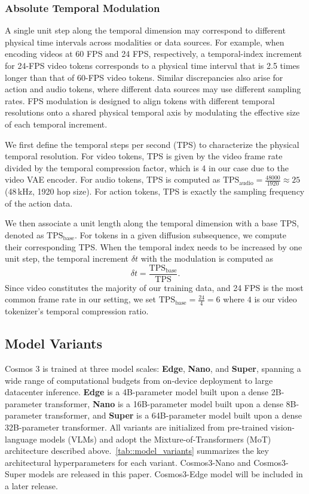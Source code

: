 \documentclass{llmxive}
\begin{document}
\subsubsection{Absolute Temporal Modulation}
A single unit step along the temporal dimension may correspond to different physical time intervals across modalities or data sources. For example, when encoding videos at 60 FPS and 24 FPS, respectively, a temporal-index increment for 24-FPS video tokens corresponds to a physical time interval that is 2.5 times longer than that of 60-FPS video tokens. Similar discrepancies also arise for action and audio tokens, where different data sources may use different sampling rates. FPS modulation is designed to align tokens with different temporal resolutions onto a shared physical temporal axis by modulating the effective size of each temporal increment.

We first define the temporal steps per second (TPS) to characterize the physical temporal resolution. For video tokens, TPS is given by the video frame rate divided by the temporal compression factor, which is 4 in our case due to the video VAE encoder. For audio tokens, TPS is computed as $\mathrm{TPS}_{\mathrm{audio}} = \frac{48000}{1920} \approx 25$ (48\,kHz, 1920 hop size). For action tokens, TPS is exactly the sampling frequency of the action data.

We then associate a unit length along the temporal dimension with a base TPS, denoted as $\mathrm{TPS}_{\mathrm{base}}$. For tokens in a given diffusion subsequence, we compute their corresponding TPS. When the temporal index needs to be increased by one unit step, the temporal increment $\delta t$ with the modulation is computed as
\begin{equation}
    \delta t = \frac{\mathrm{TPS}_{\mathrm{base}}}{\mathrm{TPS}}.
    \label{eq:fps_modulation}
\end{equation}
Since video constitutes the majority of our training data, and 24 FPS is the most common frame rate in our setting, we set $\mathrm{TPS}_{\mathrm{base}} = \frac{24}{4} = 6$ where $4$ is our video tokenizer's temporal compression ratio.

\subsection{Model Variants}

Cosmos 3 is trained at three model scales: \textbf{Edge}, \textbf{Nano}, and \textbf{Super}, spanning a wide range of computational budgets from on-device deployment to large datacenter inference. \textbf{Edge} is a 4B-parameter model built upon a dense 2B-parameter transformer, \textbf{Nano} is a 16B-parameter model built upon a dense 8B-parameter transformer, and \textbf{Super} is a 64B-parameter model built upon a dense 32B-parameter transformer. All variants are initialized from pre-trained vision-language models (VLMs) and adopt the Mixture-of-Transformers (MoT) architecture described above.~\cref{tab::model_variants} summarizes the key architectural hyperparameters for each variant. Cosmos3-Nano and Cosmos3-Super models are released in this paper. Cosmos3-Edge model will be included in a later release.
\end{document}
